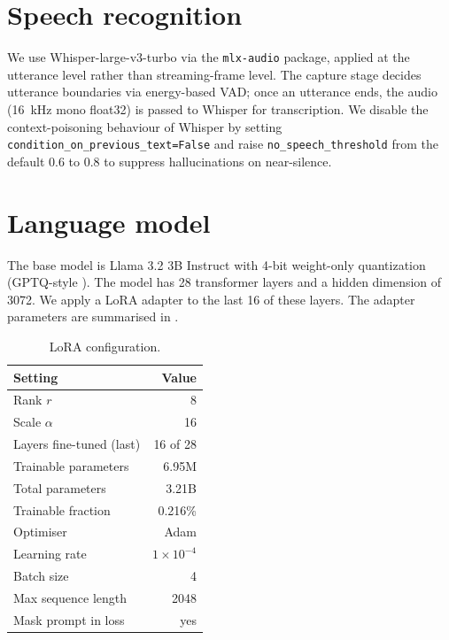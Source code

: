 \documentclass{ecsproject}
\begin{document}
\section{Speech recognition}
We use Whisper-large-v3-turbo \citep{radford2022whisper} via the
\texttt{mlx-audio} package, applied at the utterance level rather than
streaming-frame level. The capture stage decides utterance boundaries
via energy-based VAD; once an utterance ends, the audio (16~kHz mono
float32) is passed to Whisper for transcription. We disable the
context-poisoning behaviour of Whisper by setting
\texttt{condition\_on\_previous\_text=False} and raise
\texttt{no\_speech\_threshold} from the default 0.6 to 0.8 to suppress
hallucinations on near-silence.

\section{Language model}
The base model is Llama 3.2 3B Instruct \citep{meta2024llama32} with
4-bit weight-only quantization (GPTQ-style \citep{frantar2022gptq}).
The model has 28 transformer layers and a hidden dimension of 3072.
We apply a LoRA adapter to the last 16 of these layers. The adapter
parameters are summarised in .

\begin{table}[h]
\centering
\caption{LoRA configuration.}
\label{tab:lora-config}
\small
\begin{tabular}{@{}lr@{}}
\toprule
Setting                       & Value         \\
\midrule
Rank $r$                       & 8             \\
Scale $\alpha$                 & 16            \\
Layers fine-tuned (last)       & 16 of 28      \\
Trainable parameters           & 6.95M         \\
Total parameters               & 3.21B         \\
Trainable fraction             & 0.216\%       \\
Optimiser                      & Adam          \\
Learning rate                  & $1\!\times\!10^{-4}$ \\
Batch size                     & 4             \\
Max sequence length            & 2048          \\
Mask prompt in loss            & yes           \\
\bottomrule
\end{tabular}
\end{table}
\end{document}
